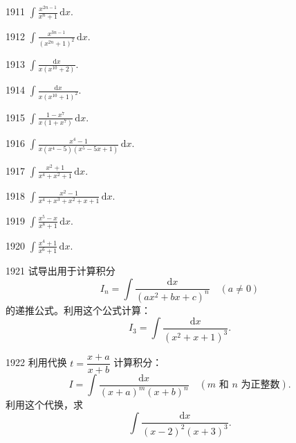 \begin{prob}[S]{1911}
$\displaystyle \int \frac{x^{2n - 1}}{x^n + 1}\,\mathrm{d}x$.
\end{prob}

\begin{prob}[S]{1912}
$\displaystyle \int \frac{x^{3n - 1}}{(x^{2n} + 1)^2}\,\mathrm{d}x$.
\end{prob}

\begin{prob}[S]{1913}
$\displaystyle \int \frac{\mathrm{d}x}{x(x^{10} + 2)}$.
\end{prob}

\begin{prob}[S]{1914}
$\displaystyle \int \frac{\mathrm{d}x}{x(x^{10} + 1)^2}$.
\end{prob}

\begin{prob}[S]{1915}
$\displaystyle \int \frac{1 - x^7}{x(1 + x^7)}\,\mathrm{d}x$.
\end{prob}

\begin{prob}[S]{1916}
$\displaystyle \int \frac{x^4 - 1}{x(x^4 - 5)(x^5 - 5x + 1)}\,\mathrm{d}x$.
\end{prob}

\begin{prob}[S]{1917}
$\displaystyle \int \frac{x^2 + 1}{x^4 + x^2 + 1}\,\mathrm{d}x$.
\end{prob}

\begin{prob}[S]{1918}
$\displaystyle \int \frac{x^2 - 1}{x^4 + x^3 + x^2 + x + 1}\,\mathrm{d}x$.
\end{prob}

\begin{prob}[S]{1919}
$\displaystyle \int \frac{x^5 - x}{x^8 + 1}\,\mathrm{d}x$.
\end{prob}

\begin{prob}[S]{1920}
$\displaystyle \int \frac{x^4 + 1}{x^6 + 1}\,\mathrm{d}x$.
\end{prob}

\begin{prob}[M]{1921}
试导出用于计算积分
\[
I_n = \int \frac{\mathrm{d}x}{(ax^2 + bx + c)^n} \quad (a \neq 0)
\]
的递推公式。利用这个公式计算：
\[
I_3 = \int \frac{\mathrm{d}x}{(x^2 + x + 1)^3}.
\]
\end{prob}

\begin{prob}[M]{1922}
利用代换 $t = \dfrac{x + a}{x + b}$ 计算积分：
\[
I = \int \frac{\mathrm{d}x}{(x + a)^m (x + b)^n} \quad (m \text{ 和 } n \text{ 为正整数}).
\]
利用这个代换，求
\[
\int \frac{\mathrm{d}x}{(x - 2)^2(x + 3)^3}.
\]
\end{prob}

